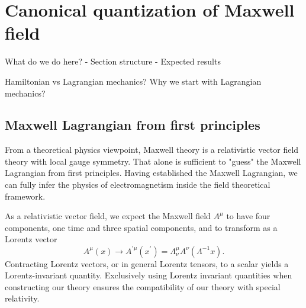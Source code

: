 \section{Canonical quantization of Maxwell field}

What do we do here?
- Section structure
- Expected results

Hamiltonian vs Lagrangian mechanics?
Why we start with Lagrangian mechanics?


\subsection{Maxwell Lagrangian from first principles}


From a theoretical physics viewpoint, Maxwell theory is a relativistic vector field theory with local gauge symmetry.
That alone is sufficient to "guess" the Maxwell Lagrangian from first principles.
Having established the Maxwell Lagrangian, we can fully infer the physics of electromagnetism inside the field theoretical framework.

As a relativistic vector field, we expect the Maxwell field $A^\mu$ to have four components, one time and three spatial components, and to transform as a Lorentz vector~\cite[p.~37]{Peskin1995}
\begin{equation}
	A^\mu(x)
	\to
	A^{\prime\mu}(x^\prime)
	=
	\Lambda^\mu_\nu
	A^\nu(\Lambda^{-1}x)
	.
\end{equation}
Contracting Lorentz vectors, or in general Lorentz tensors, to a scalar yields a Lorentz-invariant quantity.
Exclusively using Lorentz invariant quantities when constructing our theory ensures the compatibility of our theory with special relativity.

